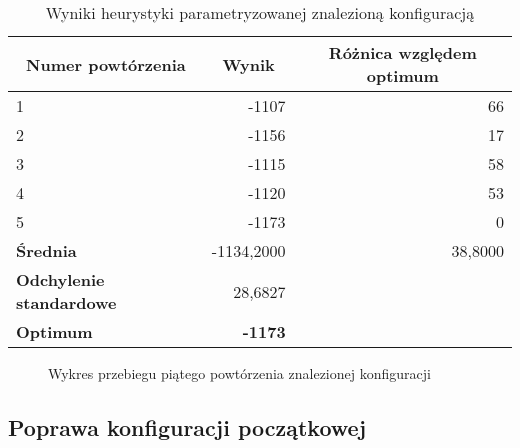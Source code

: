 \documentclass[./FM_mgr.tex]{subfiles}
\begin{document}
\begin{table}[H]
	\caption{Wyniki heurystyki parametryzowanej znalezioną konfiguracją \label{table:knapsack_init_results}}
	\centering
	\begin{tabular}{|l|r|r}
		\hline
		\multicolumn{1}{|c|}{{\bf Numer powtórzenia}} & \multicolumn{1}{c|}{{\bf Wynik}} & \multicolumn{1}{c|}{{\bf Różnica względem optimum}} \\ \hline \hline
		1                                             & -1107                            & \multicolumn{1}{r|}{66}                             \\ \hline
		2                                             & -1156                            & \multicolumn{1}{r|}{17}                             \\ \hline
		3                                             & -1115                            & \multicolumn{1}{r|}{58}                             \\ \hline
		4                                             & -1120                            & \multicolumn{1}{r|}{53}                             \\ \hline
		5                                             & -1173                            & \multicolumn{1}{r|}{0}                              \\ \hline \hline
		{\bf Średnia}                                 & -1134,2000                          & \multicolumn{1}{r|}{38,8000}                           \\ \hline
		{\bf Odchylenie standardowe}                  & 28,6827                          & \multicolumn{1}{l}{}                                \\ \hhline{==~}
		{\bf Optimum}                                 & {\bf -1173}                      & \multicolumn{1}{l}{}                                \\ \cline{1-2}
	\end{tabular}
\end{table}

\begin{figure}[H]
	\caption{Wykres przebiegu piątego powtórzenia znalezionej konfiguracji \label{figure:knapsack_init_example}}
	\centering
\end{figure}

\subsection{Poprawa konfiguracji początkowej}
\end{document}
